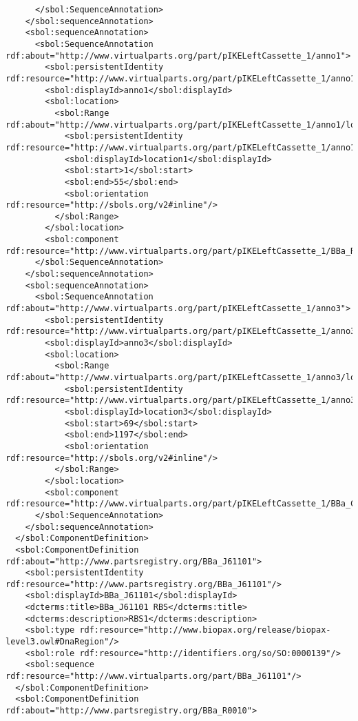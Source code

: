 \begin{lstlisting}
      </sbol:SequenceAnnotation>
    </sbol:sequenceAnnotation>
    <sbol:sequenceAnnotation>
      <sbol:SequenceAnnotation rdf:about="http://www.virtualparts.org/part/pIKELeftCassette_1/anno1">
        <sbol:persistentIdentity rdf:resource="http://www.virtualparts.org/part/pIKELeftCassette_1/anno1"/>
        <sbol:displayId>anno1</sbol:displayId>
        <sbol:location>
          <sbol:Range rdf:about="http://www.virtualparts.org/part/pIKELeftCassette_1/anno1/location1">
            <sbol:persistentIdentity rdf:resource="http://www.virtualparts.org/part/pIKELeftCassette_1/anno1/location1"/>
            <sbol:displayId>location1</sbol:displayId>
            <sbol:start>1</sbol:start>
            <sbol:end>55</sbol:end>
            <sbol:orientation rdf:resource="http://sbols.org/v2#inline"/>
          </sbol:Range>
        </sbol:location>
        <sbol:component rdf:resource="http://www.virtualparts.org/part/pIKELeftCassette_1/BBa_R0040"/>
      </sbol:SequenceAnnotation>
    </sbol:sequenceAnnotation>
    <sbol:sequenceAnnotation>
      <sbol:SequenceAnnotation rdf:about="http://www.virtualparts.org/part/pIKELeftCassette_1/anno3">
        <sbol:persistentIdentity rdf:resource="http://www.virtualparts.org/part/pIKELeftCassette_1/anno3"/>
        <sbol:displayId>anno3</sbol:displayId>
        <sbol:location>
          <sbol:Range rdf:about="http://www.virtualparts.org/part/pIKELeftCassette_1/anno3/location3">
            <sbol:persistentIdentity rdf:resource="http://www.virtualparts.org/part/pIKELeftCassette_1/anno3/location3"/>
            <sbol:displayId>location3</sbol:displayId>
            <sbol:start>69</sbol:start>
            <sbol:end>1197</sbol:end>
            <sbol:orientation rdf:resource="http://sbols.org/v2#inline"/>
          </sbol:Range>
        </sbol:location>
        <sbol:component rdf:resource="http://www.virtualparts.org/part/pIKELeftCassette_1/BBa_C0012"/>
      </sbol:SequenceAnnotation>
    </sbol:sequenceAnnotation>
  </sbol:ComponentDefinition>
  <sbol:ComponentDefinition rdf:about="http://www.partsregistry.org/BBa_J61101">
    <sbol:persistentIdentity rdf:resource="http://www.partsregistry.org/BBa_J61101"/>
    <sbol:displayId>BBa_J61101</sbol:displayId>
    <dcterms:title>BBa_J61101 RBS</dcterms:title>
    <dcterms:description>RBS1</dcterms:description>
    <sbol:type rdf:resource="http://www.biopax.org/release/biopax-level3.owl#DnaRegion"/>
    <sbol:role rdf:resource="http://identifiers.org/so/SO:0000139"/>
    <sbol:sequence rdf:resource="http://www.virtualparts.org/part/BBa_J61101"/>
  </sbol:ComponentDefinition>
  <sbol:ComponentDefinition rdf:about="http://www.partsregistry.org/BBa_R0010">

\end{lstlisting}
